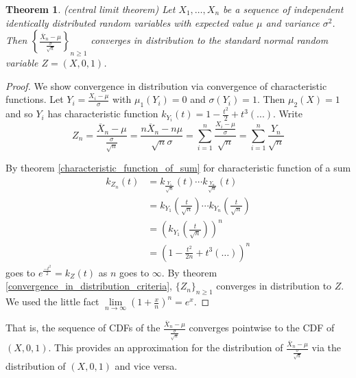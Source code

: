 \documentclass[12pt]{amsart}
\newtheorem{theorem}{Theorem}[section]
\theoremstyle{definition}
\begin{document}
\begin{theorem} (central limit theorem) Let $X_1, \dots , X_n$ be a sequence of independent identically distributed random variables with expected value $\mu$ and variance $\sigma^2$. Then $\left\{ \frac{\overline{X}_n - \mu}{\frac{\sigma}{\sqrt{n}}} \right\}_{n \geq 1}$ converges in distribution to the standard normal random variable $Z = (X,0,1)$.
\end{theorem}
\begin{proof} We show convergence in distribution via convergence of characteristic functions. Let $Y_i = \frac{X_i - \mu}{\sigma}$ with $\mu_1(Y_i) = 0$ and $\sigma(Y_i) = 1$. Then $\mu_2(X) = 1$ and so $Y_i$ has characteristic function $k_{Y_i}(t) = 1 - \frac{t^2}{2} + t^3(...)$. Write
$$Z_n = \frac{\overline{X}_n - \mu}{\frac{\sigma}{\sqrt{n}}} = \frac{n \overline{X}_n - n \mu}{\sqrt{n}\sigma} = \sum\limits_{i = 1}^n \frac{\frac{X_i - \mu}{\sigma}}{\sqrt{n}} = \sum\limits_{i = 1}^n \frac{Y_n}{\sqrt{n}}$$

By theorem \ref{characteristic_function_of_sum} for characteristic function of a sum
\begin{align*}
k_{Z_n}(t) & = k_{\frac{Y_1}{\sqrt{n}}}(t) \cdots k_{\frac{Y_n}{\sqrt{n}}}(t) \\
 & = k_{Y_1} \left( \frac{t}{\sqrt{n}} \right) \cdots k_{Y_n} \left( \frac{t}{\sqrt{n}} \right) \\
 & = \left(k_{Y_1} \left( \frac{t}{\sqrt{n}} \right) \right)^n \\
 & = \left( 1 - \frac{t^2}{2n} + t^3(\dots) \right)^n
\end{align*}
goes to $e^{\frac{- t^2}{2}} = k_{Z}(t)$ as $n$ goes to $\infty$. By theorem \ref{convergence_in_distribution_criteria}, $\{Z_n\}_{n \geq 1}$ converges in distribution to $Z$. We used the little fact $\lim\limits_{n \to \infty} (1 + \frac{x}{n})^n = e^x$.
\end{proof}

That is, the sequence of CDFs of the $\frac{\overline{X}_n - \mu}{\frac{\sigma}{\sqrt{n}}}$ converges pointwise to the CDF of $(X,0,1)$. This provides an approximation for the distribution of $\frac{\overline{X}_n - \mu}{\frac{\sigma}{\sqrt{n}}}$ via the distribution of $(X,0,1)$ and vice versa.
\end{document}
